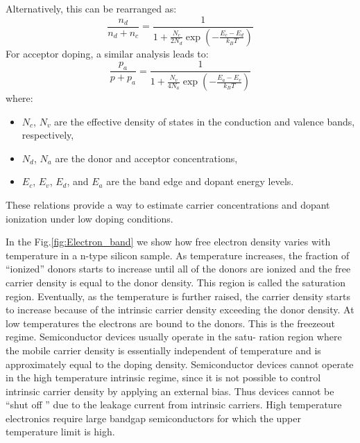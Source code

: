 \noindent
Alternatively, this can be rearranged as:
\begin{equation}
	\frac{n_d}{n_d + n_c} = \frac{1}{1 + \frac{N_c}{2 N_d} \exp\left( -\frac{E_c - E_d}{k_B T} \right)}
\end{equation}
For acceptor doping, a similar analysis leads to:
\begin{equation}
	\frac{p_a}{p + p_a} = \frac{1}{1 + \frac{N_v}{4N_a} \exp\left( -\frac{E_a - E_v}{k_B T} \right)}
\end{equation}
\noindent
where:
\begin{itemize}
	\item \( N_c \), \( N_v \) are the effective density of states in the conduction and valence bands, respectively,
	\item \( N_d \), \( N_a \) are the donor and acceptor concentrations,
	\item \( E_c \), \( E_v \), \( E_d \), and \( E_a \) are the band edge and dopant energy levels.
\end{itemize}
These relations provide a way to estimate carrier concentrations and dopant ionization under low doping conditions.

In the Fig.\ref{fig:Electron_band} we show how free electron density varies with temperature in a n-type silicon sample. As temperature increases, the fraction of “ionized” donors starts to increase until all of the donors are ionized and the free carrier density is equal to the donor density. This region is called the saturation region. Eventually, as the temperature is further raised, the carrier density starts to increase because of the intrinsic carrier density exceeding the donor density. At low temperatures the electrons are bound to the donors. This is the freezeout regime. Semiconductor devices usually operate in the satu- ration region where the mobile carrier density is essentially independent of temperature and is approximately equal to the doping density.
Semiconductor devices cannot operate in the high temperature intrinsic regime, since it is not possible to control intrinsic carrier density by applying an external bias. Thus devices cannot be “shut oﬀ ” due to the leakage current from intrinsic carriers. High temperature electronics require large bandgap semiconductors for which the upper temperature limit is high.

